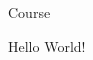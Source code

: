 \documentclass[10pt]{article}
\begin{document}
\begin{center}
    \Huge Course
\end{center}

\renewcommand*\contentsname{Contents:}
\tableofcontents

\newpage

Hello World!
\end{document}

